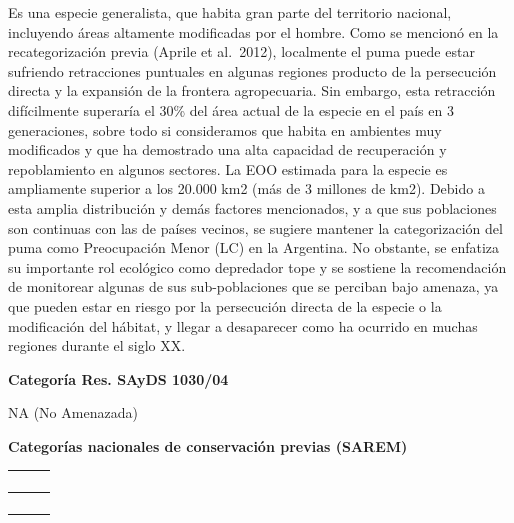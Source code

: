 \documentclass[
  x11names]{article}
\begin{document}
Es una especie generalista, que habita gran parte del territorio
nacional, incluyendo áreas altamente modificadas por el hombre. Como se
mencionó en la recategorización previa (Aprile et al.~2012), localmente
el puma puede estar sufriendo retracciones puntuales en algunas regiones
producto de la persecución directa y la expansión de la frontera
agropecuaria. Sin embargo, esta retracción difícilmente superaría el
30\% del área actual de la especie en el país en 3 generaciones, sobre
todo si consideramos que habita en ambientes muy modificados y que ha
demostrado una alta capacidad de recuperación y repoblamiento en algunos
sectores. La EOO estimada para la especie es ampliamente superior a los
20.000 km2 (más de 3 millones de km2). Debido a esta amplia distribución
y demás factores mencionados, y a que sus poblaciones son continuas con
las de países vecinos, se sugiere mantener la categorización del puma
como Preocupación Menor (LC) en la Argentina. No obstante, se enfatiza
su importante rol ecológico como depredador tope y se sostiene la
recomendación de monitorear algunas de sus sub-poblaciones que se
perciban bajo amenaza, ya que pueden estar en riesgo por la persecución
directa de la especie o la modificación del hábitat, y llegar a
desaparecer como ha ocurrido en muchas regiones durante el siglo XX.

\textbf{Categoría Res. SAyDS 1030/04}

NA (No Amenazada)

\textbf{Categorías nacionales de conservación previas (SAREM)}

\begin{tabu} to 
\toprule
\textbf{} &  & \\
\bottomrule
\end{tabu}

\begin{tabu} to 
\toprule
\textbf{} &  & \\
\bottomrule
\end{tabu}

\begin{tabu} to 
\toprule
\textbf{} &  & \\
\bottomrule
\end{tabu}
\end{document}
